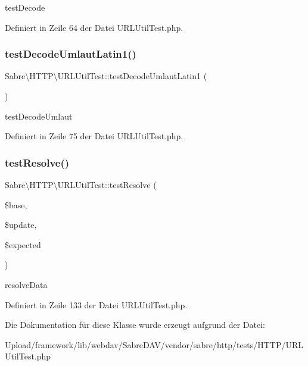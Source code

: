 test\+Decode 

Definiert in Zeile 64 der Datei U\+R\+L\+Util\+Test.\+php.

\mbox{\label{class_sabre_1_1_h_t_t_p_1_1_u_r_l_util_test_afc4c56b1444f9e8e05355ad5ffc54f1d}} 
\subsubsection{\texorpdfstring{test\+Decode\+Umlaut\+Latin1()}{testDecodeUmlautLatin1()}}
{\footnotesize\ttfamily Sabre\textbackslash{}\+H\+T\+T\+P\textbackslash{}\+U\+R\+L\+Util\+Test\+::test\+Decode\+Umlaut\+Latin1 (\begin{DoxyParamCaption}{ }\end{DoxyParamCaption})}

test\+Decode\+Umlaut 

Definiert in Zeile 75 der Datei U\+R\+L\+Util\+Test.\+php.

\mbox{\label{class_sabre_1_1_h_t_t_p_1_1_u_r_l_util_test_a72f219ca80c37a22908e6f0b7205cbd4}} 
\subsubsection{\texorpdfstring{test\+Resolve()}{testResolve()}}
{\footnotesize\ttfamily Sabre\textbackslash{}\+H\+T\+T\+P\textbackslash{}\+U\+R\+L\+Util\+Test\+::test\+Resolve (\begin{DoxyParamCaption}\item[{}]{\$base,  }\item[{}]{\$update,  }\item[{}]{\$expected }\end{DoxyParamCaption})}

resolve\+Data 

Definiert in Zeile 133 der Datei U\+R\+L\+Util\+Test.\+php.



Die Dokumentation für diese Klasse wurde erzeugt aufgrund der Datei\+:\begin{DoxyCompactItemize}
\item 
Upload/framework/lib/webdav/\+Sabre\+D\+A\+V/vendor/sabre/http/tests/\+H\+T\+T\+P/U\+R\+L\+Util\+Test.\+php\end{DoxyCompactItemize}
